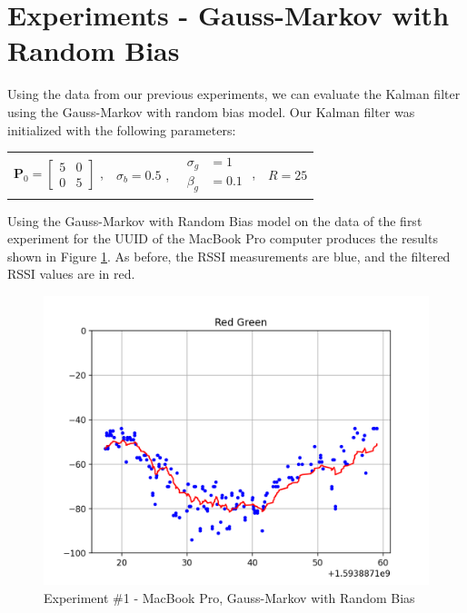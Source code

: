 \documentclass[12pt]{article}
\begin{document}
%
%

\clearpage
\section{Experiments - Gauss-Markov with Random Bias}

Using the data from our previous experiments, we can evaluate the Kalman filter using the
Gauss-Markov with random bias model. Our Kalman filter was initialized with the following
parameters:

\begin{center}
    \begin{tabular}{cccc}
        $\mathbf{P}_0 = 
        \begin{bmatrix}
        5 & 0 \\
        0  & 5
        \end{bmatrix}$ ,
        &
        $\sigma_b = 0.5$ ,
        &
        $\begin{aligned}
        \sigma_g &= 1 \\
        \beta_g  &= 0.1
        \end{aligned}$ ,
        &
        $R = 25$
    \end{tabular}
\end{center}

Using the Gauss-Markov with Random Bias model on the data of the first experiment for
the UUID of the MacBook Pro computer produces the results shown in Figure
\ref{fig:experiment-1-mbp-gmrb}. As before, the RSSI measurements are blue, and the
filtered RSSI values are in red.

\begin{figure}[ht]
    \centering
    \includegraphics[width=1.0\textwidth]{Experiment-1-MBP-GMRB.png}
    \caption{Experiment \#1 - MacBook Pro, Gauss-Markov with Random Bias}
    \label{fig:experiment-1-mbp-gmrb}
\end{figure}
\end{document}
